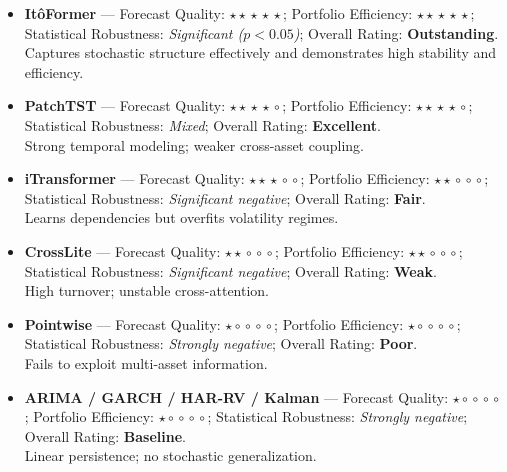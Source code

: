 \documentclass[10pt,twocolumn]{article}
\begin{document}
\begin{itemize}[leftmargin=1.5em]
  \item \textbf{ItôFormer} — Forecast Quality: $\star\!\star\!\star\!\star\!\star$; 
  Portfolio Efficiency: $\star\!\star\!\star\!\star\!\star$; 
  Statistical Robustness: \emph{Significant ($p<0.05$)}; 
  Overall Rating: \textbf{Outstanding}.\\
  Captures stochastic structure effectively and demonstrates high stability and efficiency.

  \item \textbf{PatchTST} — Forecast Quality: $\star\!\star\!\star\!\star\!\circ$; 
  Portfolio Efficiency: $\star\!\star\!\star\!\star\!\circ$; 
  Statistical Robustness: \emph{Mixed}; 
  Overall Rating: \textbf{Excellent}.\\
  Strong temporal modeling; weaker cross-asset coupling.

  \item \textbf{iTransformer} — Forecast Quality: $\star\!\star\!\star\!\circ\!\circ$; 
  Portfolio Efficiency: $\star\!\star\!\circ\!\circ\!\circ$; 
  Statistical Robustness: \emph{Significant negative}; 
  Overall Rating: \textbf{Fair}.\\
  Learns dependencies but overfits volatility regimes.

  \item \textbf{CrossLite} — Forecast Quality: $\star\!\star\!\circ\!\circ\!\circ$; 
  Portfolio Efficiency: $\star\!\star\!\circ\!\circ\!\circ$; 
  Statistical Robustness: \emph{Significant negative}; 
  Overall Rating: \textbf{Weak}.\\
  High turnover; unstable cross-attention.

  \item \textbf{Pointwise} — Forecast Quality: $\star\!\circ\!\circ\!\circ\!\circ$; 
  Portfolio Efficiency: $\star\!\circ\!\circ\!\circ\!\circ$; 
  Statistical Robustness: \emph{Strongly negative}; 
  Overall Rating: \textbf{Poor}.\\
  Fails to exploit multi-asset information.

  \item \textbf{ARIMA / GARCH / HAR-RV / Kalman} — Forecast Quality: $\star\!\circ\!\circ\!\circ\!\circ$; 
  Portfolio Efficiency: $\star\!\circ\!\circ\!\circ\!\circ$; 
  Statistical Robustness: \emph{Strongly negative}; 
  Overall Rating: \textbf{Baseline}.\\
  Linear persistence; no stochastic generalization.
\end{itemize}
\end{document}
